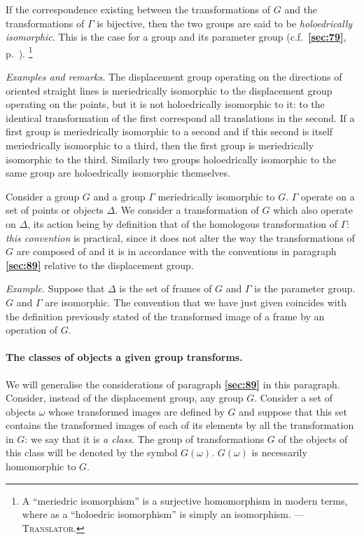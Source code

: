 \documentclass[leqno,11pt]{book}
\numberwithin{equation}{chapter}
\theoremstyle{shape1}
\theoremstyle{shapesmall}
\newcommand{\fsref}[1]{{\rm\textsection\textbf{\ref{sec:#1}}}}
\newcommand{\somespace}{\vspace{9pt}}
\begin{document}
If the correspondence existing between the transformations of $G$ and the transformations of $\Gamma$ is bijective, then the two groups are said to be \emph{holoedrically isomorphic}. This is the case for a group and its parameter group (c.f.~\fsref{79}, p.~\pageref{sec:79}). \footnote{A ``meriedric isomorphism'' is a surjective homomorphism in modern terms, where as a ``holoedric isomorphism'' is simply an isomorphism. ---\textsc{Translator.}}

\somespace

{\small
\emph{Examples and remarks.} The displacement group operating on the directions of oriented straight lines is meriedrically isomorphic to the displacement group operating on the points, but it is not holoedrically isomorphic to it: to the identical transformation of the first correspond all translations in the second. If a first group is meriedrically isomorphic to a second and if this second is itself meriedrically isomorphic to a third, then the first group is meriedrically isomorphic to the third. Similarly two groups holoedrically isomorphic to the same group are holoedrically isomorphic themselves.
}

\somespace

Consider a group $G$ and a group $\Gamma$ meriedrically isomorphic to $G$. $\Gamma$ operate on a set of points or objects $\Delta$. We consider a transformation of $G$ which also operate on $\Delta$, its action being by definition that of the homologous transformation of $\Gamma$: \emph{this convention} is practical, since it does not alter the way the transformations of $G$ are composed of and it is in accordance with the conventions in paragraph \fsref{89} relative to the displacement group.

\somespace
{\small
\emph{Example.} Suppose that $\Delta$ is the set of frames of $G$ and $\Gamma$ is the parameter group. $G$ and $\Gamma$ are isomorphic. The convention that we have just given coincides with the definition previously stated of the transformed image of a frame by an operation of $G$.
}

\paragraph{The classes of objects a given group transforms.}
\label{sec:91}
We will generalise the considerations of paragraph \fsref{89} in this paragraph. Consider, instead of the displacement group, any group $G$. Consider a set of objects $\omega$ whose transformed images are defined by $G$ and suppose that this set contains the transformed images of each of its elements by all the transformation in $G$: we say that it is \emph{a class}. The group of transformations $G$ of the objects of this class will be denoted by the symbol $G(\omega)$. $G(\omega)$ is necessarily homomorphic to $G$.
\end{document}
